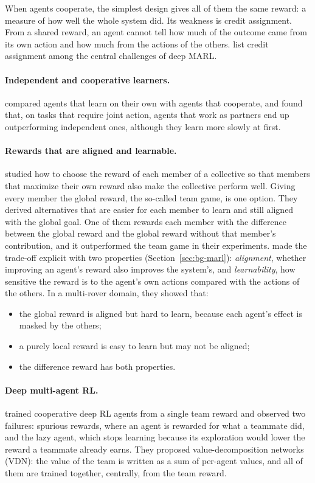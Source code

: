 When agents cooperate, the simplest design gives all of them the same reward: a measure of how well the
whole system did. Its weakness is credit assignment. From a shared reward, an agent cannot tell how much of
the outcome came from its own action and how much from the actions of the others.
\citet{gronauer+22marlsurvey} list credit assignment among the central challenges of deep \ac{MARL}.

\paragraph{Independent and cooperative learners.} \citet{tan93independent} compared agents that learn on
their own with agents that cooperate, and found that, on tasks that require joint action,
agents that work as partners end up outperforming independent ones, although they learn more slowly at
first.

\paragraph{Rewards that are aligned and learnable.} \citet{wolpert+01collectives} studied how to choose
the reward of each member of a collective so that members that maximize their own reward also make the
collective perform well. Giving every member the global reward, the so-called team game, is one option.
They derived alternatives that are easier for each member to learn and still aligned with the global goal.
One of them rewards each member with the difference between the global reward and the global reward
without that member's contribution, and it outperformed the team game in their experiments.
\citet{agogino+08rewards} made the trade-off explicit with two properties (Section~\ref{sec:bg-marl}):
\emph{alignment}, whether improving an agent's reward also improves the system's, and
\emph{learnability}, how sensitive the reward is to the agent's own actions compared with the actions of
the others. In a multi-rover domain, they showed that:
\begin{itemize}[nosep]
  \item the global reward is aligned but hard to learn, because each agent's effect is masked by the
    others;
  \item a purely local reward is easy to learn but may not be aligned;
  \item the difference reward has both properties.
\end{itemize}

\paragraph{Deep multi-agent \acs{RL}.} \citet{sunehag+18vdn} trained cooperative deep \ac{RL} agents from
a single team reward and observed two failures: spurious rewards, where an agent is rewarded for what a
teammate did, and the lazy agent, which stops learning because its exploration would lower the reward a
teammate already earns. They proposed value-decomposition networks (VDN): the value of the team is
written as a sum of per-agent values, and all of them are trained together, centrally, from the team
reward.

